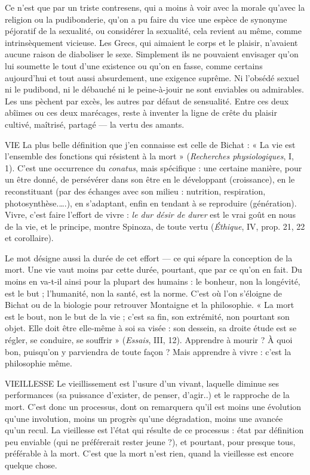 Ce n’est que par un triste contresens, qui a moins à voir avec la morale
qu'avec la religion ou la pudibonderie, qu’on a pu faire du vice une espèce de
synonyme péjoratif de la sexualité, ou considérer la sexualité, cela revient au
même, comme intrinsèquement vicieuse. Les Grecs, qui aimaient le corps et
le plaisir, n’avaient aucune raison de diaboliser le sexe. Simplement ils ne
pouvaient envisager qu’on lui soumette le tout d’une existence ou qu’on en
fasse, comme certains aujourd’hui et tout aussi absurdement, une exigence
suprême. Ni l’obsédé sexuel ni le pudibond, ni le débauché ni le peine-à-jouir
ne sont enviables ou admirables. Les uns pèchent par excès, les autres par
défaut de sensualité. Entre ces deux abîimes ou ces deux marécages, reste à
inventer la ligne de crête du plaisir cultivé, maîtrisé, partagé — la vertu des
amants.

VIE La plus belle définition que j'en connaisse est celle de Bichat : « La vie
est l’ensemble des fonctions qui résistent à la mort » ({\it Recherches physiologiques},
I, 1). C’est une occurrence du {\it conatus}, mais spécifique : une certaine
manière, pour un être donné, de persévérer dans son être en le développant
(croissance), en le reconstituant (par des échanges avec son milieu : nutrition,
respiration, photosynthèse.….), en s’adaptant, enfin en tendant à se reproduire
(génération). Vivre, c’est faire l’effort de vivre : {\it le dur désir de durer} est le vrai
goût en nous de la vie, et le principe, montre Spinoza, de toute vertu ({\it Éthique},
IV, prop. 21, 22 et corollaire).

Le mot désigne aussi la durée de cet effort — ce qui sépare la conception de
la mort. Une vie vaut moins par cette durée, pourtant, que par ce qu’on en fait.
Du moins en va-t-il ainsi pour la plupart des humains : le bonheur, non la longévité,
est le but ; l'humanité, non la santé, est la norme. C’est où l’on s'éloigne
de Bichat ou de la biologie pour retrouver Montaigne et la philosophie. « La
mort est le bout, non le but de la vie ; c’est sa fin, son extrémité, non pourtant
son objet. Elle doit être elle-même à soi sa visée : son dessein, sa droite étude
est se régler, se conduire, se souffrir » ({\it Essais}, III, 12). Apprendre à mourir ? À
quoi bon, puisqu'on y parviendra de toute façon ? Mais apprendre à vivre :
c’est la philosophie même.

VIEILLESSE Le vieillissement est l’usure d’un vivant, laquelle diminue ses
performances (sa puissance d’exister, de penser, d’agir..) et le
rapproche de la mort. C’est donc un processus, dont on remarquera qu'il est
moins une évolution qu’une involution, moins un progrès qu’une dégradation,
moins une avancée qu'un recul. La vieillesse est l’état qui résulte de ce
processus : état par définition peu enviable (qui ne préférerait rester jeune ?), et
pourtant, pour presque tous, préférable à la mort. C’est que la mort n'est rien,
quand la vieillesse est encore quelque chose.

